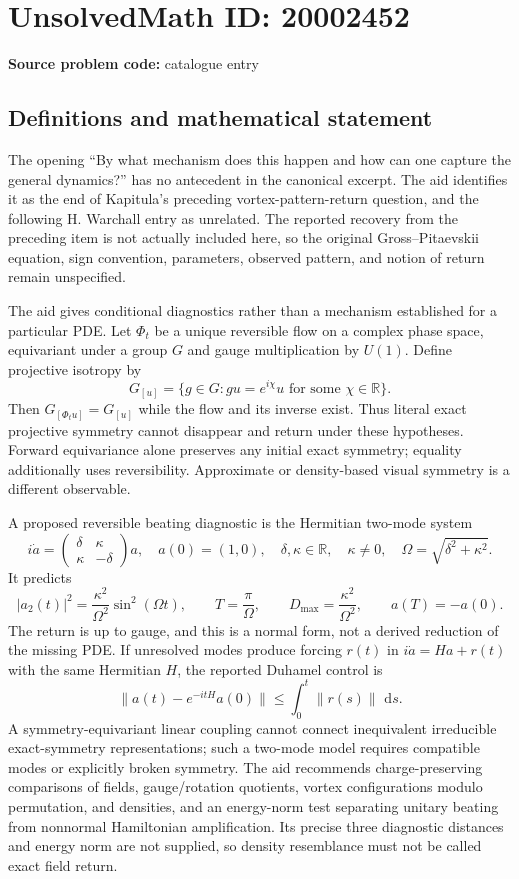 \documentclass[11pt]{article}
\newcommand{\R}{\mathbb{R}}
\newcommand{\dd}{\,\mathrm{d}}
\begin{document}
\section*{UnsolvedMath ID: 20002452}
\textbf{Source problem code:} catalogue entry
\subsection{Definitions and mathematical statement}
The opening ``By what mechanism does this happen and how can one capture the general dynamics?'' has no antecedent in the canonical excerpt. The aid identifies it as the end of Kapitula's preceding vortex-pattern-return question, and the following H. Warchall entry as unrelated. The reported recovery from the preceding item is not actually included here, so the original Gross--Pitaevskii equation, sign convention, parameters, observed pattern, and notion of return remain unspecified.

The aid gives conditional diagnostics rather than a mechanism established for a particular PDE. Let $\Phi_t$ be a unique reversible flow on a complex phase space, equivariant under a group $G$ and gauge multiplication by $U(1)$. Define projective isotropy by
\[
G_{[u]}=\{g\in G:gu=e^{i\chi}u\text{ for some }\chi\in\R\}.
\]
Then $G_{[\Phi_tu]}=G_{[u]}$ while the flow and its inverse exist. Thus literal exact projective symmetry cannot disappear and return under these hypotheses. Forward equivariance alone preserves any initial exact symmetry; equality additionally uses reversibility. Approximate or density-based visual symmetry is a different observable.

A proposed reversible beating diagnostic is the Hermitian two-mode system
\[
i\dot a=\begin{pmatrix}\delta&\kappa\\\kappa&-\delta\end{pmatrix}a,
\quad a(0)=(1,0),\quad\delta,\kappa\in\R,\quad\kappa\ne0,\quad
\Omega=\sqrt{\delta^2+\kappa^2}.
\]
It predicts
\[
|a_2(t)|^2=\frac{\kappa^2}{\Omega^2}\sin^2(\Omega t),\qquad
T=\frac\pi\Omega,\qquad D_{\max}=\frac{\kappa^2}{\Omega^2},\qquad a(T)=-a(0).
\]
The return is up to gauge, and this is a normal form, not a derived reduction of the missing PDE. If unresolved modes produce forcing $r(t)$ in $i\dot a=Ha+r(t)$ with the same Hermitian $H$, the reported Duhamel control is
\[
\|a(t)-e^{-itH}a(0)\|\leq\int_0^t\|r(s)\|\,\dd s.
\]
A symmetry-equivariant linear coupling cannot connect inequivalent irreducible exact-symmetry representations; such a two-mode model requires compatible modes or explicitly broken symmetry. The aid recommends charge-preserving comparisons of fields, gauge/rotation quotients, vortex configurations modulo permutation, and densities, and an energy-norm test separating unitary beating from nonnormal Hamiltonian amplification. Its precise three diagnostic distances and energy norm are not supplied, so density resemblance must not be called exact field return.
\end{document}
